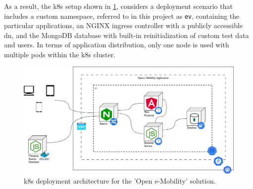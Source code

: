 As a result, the \acrshort{k8s} setup shown in \ref{fig:k8s-setup}, considers a deployment scenario that includes a custom namespace, referred to in this project as \verb|ev|, containing the particular applications, an NGINX ingress controller with a publicly accessible \acrshort{dn}, and the MongoDB database with built-in reinitialization of custom test data and users.
In terms of application distribution, only one node is used with multiple pods within the \acrshort{k8s} cluster.

\begin{figure}[h]
    \centering
    \includegraphics[scale=0.4]{resources/images/main/3_approach/KubernetesDeployment.png}
    \caption{\acrshort{k8s} deployment architecture for the 'Open e-Mobility' \cite{noauthor_open_2023} solution.}
    \label{fig:k8s-setup}
\end{figure}

